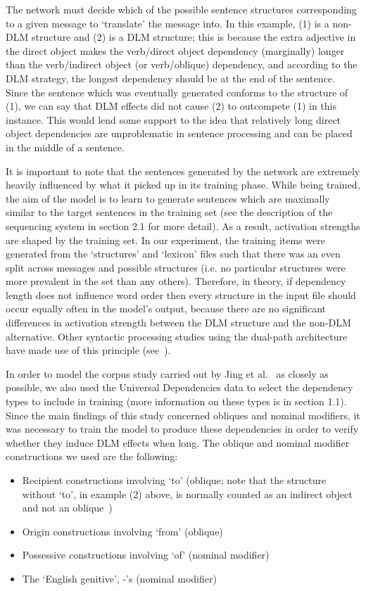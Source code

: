 \documentclass{article}
\begin{document}
The network must decide which of the possible sentence structures corresponding to a given message to `translate' the message into. In this example, (1) is a non-DLM structure and (2) is a DLM structure; this is because the extra adjective in the direct object makes the verb/direct object dependency (marginally) longer than the verb/indirect object (or verb/oblique) dependency, and according to the DLM strategy, the longest dependency should be at the end of the sentence. Since the sentence which was eventually generated conforms to the structure of (1), we can say that DLM effects did not cause (2) to outcompete (1) in this instance. This would lend some support to the idea that relatively long direct object dependencies are unproblematic in sentence processing and can be placed in the middle of a sentence.

It is important to note that the sentences generated by the network are extremely heavily influenced by what it picked up in its training phase. While being trained, the aim of the model is to learn to generate sentences which are maximally similar to the target sentences in the training set (see the description of the sequencing system in section 2.1 for more detail). As a result, activation strengths are shaped by the training set. In our experiment, the training items were generated from the `structures' and `lexicon' files such that there was an even split across messages and possible structures (i.e. no particular structures were more prevalent in the set than any others). Therefore, in theory, if dependency length does not influence word order then every structure in the input file should occur equally often in the model's output, because there are no significant differences in activation strength between the DLM structure and the non-DLM alternative. Other syntactic processing studies using the dual-path architecture have made use of this principle (see~\cite{twomey2014}).


In order to model the corpus study carried out by Jing et al.~\cite{jing2021} as closely as possible, we also used the Universal Dependencies data to select the dependency types to include in training (more information on these types is in section 1.1). Since the main findings of this study concerned obliques and nominal modifiers, it was necessary to train the model to produce these dependencies in order to verify whether they induce DLM effects when long. The oblique and nominal modifier constructions we used are the following:
\begin{itemize}
	\item Recipient constructions involving `to' (oblique; note that the structure without `to', in example (2) above, is normally counted as an indirect object and not an oblique~\cite{nivre2020})
	\item Origin constructions involving `from' (oblique)
	\item Possessive constructions involving `of' (nominal modifier)
	\item The `English genitive', -'s (nominal modifier)
\end{itemize}
\end{document}
